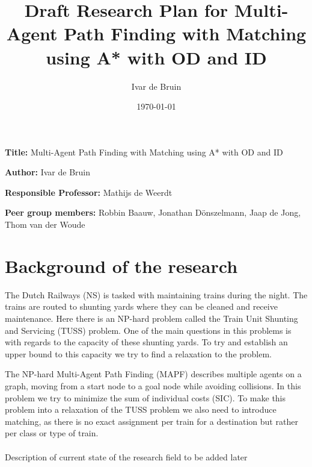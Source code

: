 \documentclass[english]{article}
\title{Draft Research Plan for Multi-Agent Path Finding with Matching using A* with OD and ID}
\author{Ivar de Bruin}
\date{\today}
\newcommand{\namelistlabel}[1]{\mbox{#1}\hfil}
\newenvironment{namelist}[1]{%
\begin{list}{}
    {
        \let\makelabel\namelistlabel
        \settowidth{\labelwidth}{#1}
        \setlength{\leftmargin}{1.1\labelwidth}
    }
  }{%
\end{list}}
\begin{document}
\maketitle

\begin{namelist}{xxxxxxxxxxxxxxxxxxxxxxxxxxxxxxxxxxxxxxx}
\item[{\bf Title:}]
	Multi-Agent Path Finding with Matching using A* with OD and ID
\item[{\bf Author:}]
	Ivar de Bruin
\item[{\bf Responsible Professor:}]
	Mathijs de Weerdt
\item[{\bf Peer group members:}]
	Robbin Baauw, Jonathan D\"onszelmann, Jaap de Jong, Thom van der Woude
\end{namelist}


\section*{Background of the research}
The Dutch Railways (NS) is tasked with maintaining trains during the night. 
The trains are routed to shunting yards where they can be cleaned and receive maintenance. 
Here there is an NP-hard problem called the Train Unit Shunting and Servicing (TUSS) problem. 
One of the main questions in this problems is with regards to the capacity of these shunting yards. 
To try and establish an upper bound to this capacity we try to find a relaxation to the problem. 

The NP-hard Multi-Agent Path Finding (MAPF) describes multiple agents on a graph, moving from a start node to a goal node while avoiding collisions. 
In this problem we try to minimize the sum of individual costs (SIC).
To make this problem into a relaxation of the TUSS problem we also need to introduce matching, as there is no exact assignment per train for a destination but rather per class or type of train.
\\\\%
{\color{red}Description of current state of the research field to be added later}
\end{document}
